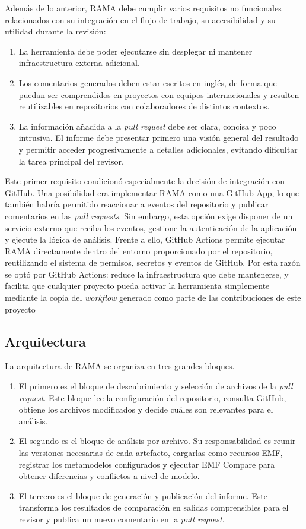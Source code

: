 \documentclass[11pt]{article}
\begin{document}
Además de lo anterior, RAMA debe cumplir varios requisitos no funcionales relacionados con su integración en el flujo de trabajo, su accesibilidad y su utilidad durante la revisión:

\begin{enumerate}
    \item La herramienta debe poder ejecutarse sin desplegar ni mantener infraestructura externa adicional.
    \item Los comentarios generados deben estar escritos en inglés, de forma que puedan ser comprendidos en proyectos con equipos internacionales y resulten reutilizables en repositorios con colaboradores de distintos contextos.
    \item La información añadida a la \textit{pull request} debe ser clara, concisa y poco intrusiva. El informe debe presentar primero una visión general del resultado y permitir acceder progresivamente a detalles adicionales, evitando dificultar la tarea principal del revisor.
\end{enumerate}

Este primer requisito condicionó especialmente la decisión de integración con GitHub. Una posibilidad era implementar RAMA como una GitHub App, lo que también habría permitido reaccionar a eventos del repositorio y publicar comentarios en las \textit{pull requests}. Sin embargo, esta opción exige disponer de un servicio externo que reciba los eventos, gestione la autenticación de la aplicación y ejecute la lógica de análisis. Frente a ello, GitHub Actions permite ejecutar RAMA directamente dentro del entorno proporcionado por el repositorio, reutilizando el sistema de permisos, secretos y eventos de GitHub. Por esta razón se optó por GitHub Actions: reduce la infraestructura que debe mantenerse, y facilita que cualquier proyecto pueda activar la herramienta simplemente mediante la copia del \textit{workflow} generado como parte de las contribuciones de este proyecto

\subsection{Arquitectura}

La arquitectura de RAMA se organiza en tres grandes bloques.

\begin{enumerate}
    \item El primero es el bloque de descubrimiento y selección de archivos de la \textit{pull request}. Este bloque lee la configuración del repositorio, consulta GitHub, obtiene los archivos modificados y decide cuáles son relevantes para el análisis.
    \item El segundo es el bloque de análisis por archivo. Su responsabilidad es reunir las versiones necesarias de cada artefacto, cargarlas como recursos EMF, registrar los metamodelos configurados y ejecutar EMF Compare para obtener diferencias y conflictos a nivel de modelo.
    \item El tercero es el bloque de generación y publicación del informe. Este transforma los resultados de comparación en salidas comprensibles para el revisor y publica un nuevo comentario en la \textit{pull request}.
\end{enumerate}
\end{document}
